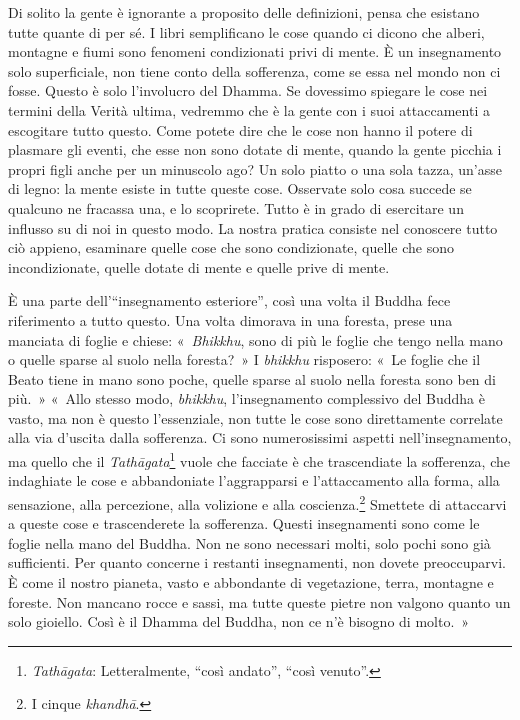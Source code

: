 Di solito la gente è ignorante a proposito delle definizioni, pensa che
esistano tutte quante di per sé. I libri semplificano le cose quando ci
dicono che alberi, montagne e fiumi sono fenomeni condizionati privi di
mente. È un insegnamento solo superficiale, non tiene conto della
sofferenza, come se essa nel mondo non ci fosse. Questo è solo
l'involucro del Dhamma. Se dovessimo spiegare le cose nei termini della
Verità ultima, vedremmo che è la gente con i suoi attaccamenti a
escogitare tutto questo. Come potete dire che le cose non hanno il
potere di plasmare gli eventi, che esse non sono dotate di mente, quando
la gente picchia i propri figli anche per un minuscolo ago? Un solo
piatto o una sola tazza, un'asse di legno: la mente esiste in tutte
queste cose. Osservate solo cosa succede se qualcuno ne fracassa una, e
lo scoprirete. Tutto è in grado di esercitare un influsso su di noi in
questo modo. La nostra pratica consiste nel conoscere tutto ciò appieno,
esaminare quelle cose che sono condizionate, quelle che sono
incondizionate, quelle dotate di mente e quelle prive di mente.

È una parte dell'``insegnamento esteriore'', così una volta il Buddha
fece riferimento a tutto questo. Una volta dimorava in una foresta,
prese una manciata di foglie e chiese: «~\emph{Bhikkhu}, sono di più le
foglie che tengo nella mano o quelle sparse al suolo nella foresta?~» I
\emph{bhikkhu} risposero: «~Le foglie che il Beato tiene in mano sono
poche, quelle sparse al suolo nella foresta sono ben di più.~» «~Allo
stesso modo, \emph{bhikkhu}, l'insegnamento complessivo del Buddha è
vasto, ma non è questo l'essenziale, non tutte le cose sono direttamente
correlate alla via d'uscita dalla sofferenza. Ci sono numerosissimi
aspetti nell'insegnamento, ma quello che il \emph{Tathāgata}\footnote{\emph{Tathāgata}:
  Letteralmente, ``così andato'', ``così venuto''.} vuole che facciate è
che trascendiate la sofferenza, che indaghiate le cose e abbandoniate
l'aggrapparsi e l'attaccamento alla forma, alla sensazione, alla
percezione, alla volizione e alla coscienza.\footnote{I cinque
  \emph{khandhā}.} Smettete di attaccarvi a queste cose e trascenderete
la sofferenza. Questi insegnamenti sono come le foglie nella mano del
Buddha. Non ne sono necessari molti, solo pochi sono già sufficienti.
Per quanto concerne i restanti insegnamenti, non dovete preoccuparvi. È
come il nostro pianeta, vasto e abbondante di vegetazione, terra,
montagne e foreste. Non mancano rocce e sassi, ma tutte queste pietre
non valgono quanto un solo gioiello. Così è il Dhamma del Buddha, non ce
n'è bisogno di molto.~»

